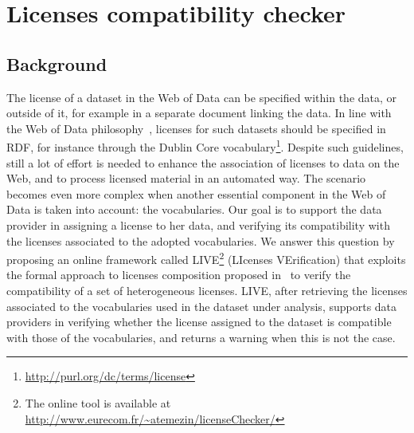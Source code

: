 \section{Licenses compatibility checker}
\label{sec:checker}

\subsection{Background}
The license of a dataset in the Web of Data can be specified within the data, or outside of it, for example in a separate document linking the data. In line with the Web of Data philosophy~\cite{LinkedData2011}, licenses for such datasets should be specified in RDF, for instance through the Dublin Core vocabulary\footnote{\url{http://purl.org/dc/terms/license}}. Despite such guidelines, still a lot of effort is needed to enhance the association of licenses to data on the Web, and to process licensed material in an automated way. The scenario becomes even more complex when another essential component in the Web of Data is taken into account: the vocabularies. Our goal is to support the data provider in assigning a license to her data, and verifying its compatibility with the licenses associated to the adopted vocabularies.      
%
We answer this question by proposing an online framework called LIVE\footnote{The online tool is available at \url{http://www.eurecom.fr/~atemezin/licenseChecker/}} (LIcenses VErification) that exploits the formal approach to licenses composition proposed in~\cite{DBLP:conf/semweb/GovernatoriRVG13} to verify the compatibility of a set of heterogeneous licenses. LIVE, after retrieving the licenses associated to the vocabularies used in the dataset under analysis, supports data providers in verifying whether the license assigned to the dataset is compatible with those of the vocabularies, and returns a warning when this is not the case. 

